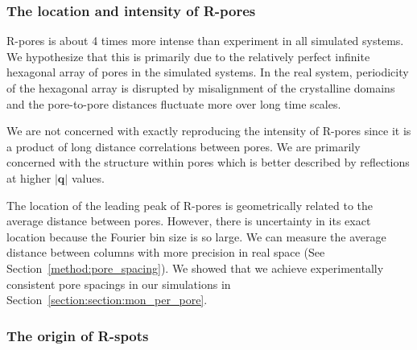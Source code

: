 \documentclass[journal=jpcbfk,manuscript=article]{achemso}
\begin{document}
  \subsubsection{The location and intensity of R-pores}\label{section:rpores}
  
  R-pores is about 4 times more intense than experiment in all simulated systems. We
  hypothesize that this is primarily due to the relatively perfect infinite hexagonal
  array of pores in the simulated systems. In the real system, periodicity of the 
  hexagonal array is disrupted by misalignment of the crystalline domains and the
  pore-to-pore distances fluctuate more over long time scales. 
   
  We are not concerned with exactly reproducing the intensity of R-pores since it is a 
  product of long distance correlations between pores. We are primarily concerned with
  the structure within pores which is better described by reflections at higher 
  $|\mathbf{q}|$ values. 
  
  The location of the leading peak of R-pores is geometrically related to the average 
  distance between pores. However, there is uncertainty in its exact location because
  the Fourier bin size is so large. We can measure the average distance between columns
  with more precision in real space (See Section~\ref{method:pore_spacing}). We showed
  that we achieve experimentally consistent pore spacings in our simulations in 
  Section~\ref{section:section:mon_per_pore}. 

  \subsubsection{The origin of R-spots}\label{section:rspots}
  
\end{document}
